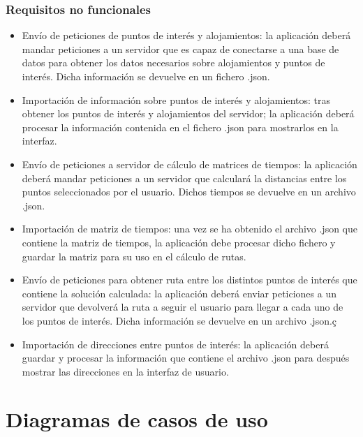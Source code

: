 \subsubsection[Requisitos no funcionales]{Requisitos no funcionales}
\begin{itemize}
	\item Envío de peticiones de puntos de interés y alojamientos: la aplicación deberá mandar peticiones a un servidor que es capaz de conectarse a una base de datos para obtener los datos necesarios sobre alojamientos y puntos de interés. Dicha información se devuelve en un fichero .json.
	\item Importación de información sobre puntos de interés y alojamientos: tras obtener los puntos de interés y alojamientos del servidor; la aplicación deberá procesar la información contenida en el fichero .json para mostrarlos en la interfaz.
	\item Envío de peticiones a servidor de cálculo de matrices de tiempos: la aplicación deberá mandar peticiones a un servidor que calculará la distancias entre los puntos seleccionados por el usuario. Dichos tiempos se devuelve en un archivo .json.
	\item Importación de matriz de tiempos: una vez se ha obtenido el archivo .json que contiene la matriz de tiempos, la aplicación debe procesar dicho fichero y guardar la matriz para su uso en el cálculo de rutas.
	\item Envío de peticiones para obtener ruta entre los distintos puntos de interés que contiene la solución calculada: la aplicación deberá enviar peticiones a un servidor que devolverá la ruta a seguir el usuario para llegar a cada uno de los puntos de interés. Dicha información se devuelve en un archivo .json.ç
	
	\item Importación de direcciones entre puntos de interés: la aplicación deberá guardar y procesar la información que contiene el archivo .json para después mostrar las direcciones en la interfaz de usuario.
\end{itemize}

\section[Casos de uso]{Diagramas de casos de uso}
